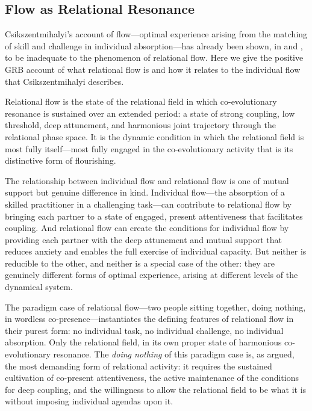 \subsection{Flow as Relational Resonance}
\label{p14:subsec:flow-grb}

\noindent
Csikszentmihalyi's account of flow---optimal experience arising from the matching of skill and challenge in individual absorption---has already been shown, in  and , to be inadequate to the phenomenon of relational flow. Here we give the positive GRB account of what relational flow is and how it relates to the individual flow that Csikszentmihalyi describes.

Relational flow is the state of the relational field in which co-evolutionary resonance is sustained over an extended period: a state of strong coupling, low threshold, deep attunement, and harmonious joint trajectory through the relational phase space. It is the dynamic condition in which the relational field is most fully itself---most fully engaged in the co-evolutionary activity that is its distinctive form of flourishing.

The relationship between individual flow and relational flow is one of mutual support but genuine difference in kind. Individual flow---the absorption of a skilled practitioner in a challenging task---can contribute to relational flow by bringing each partner to a state of engaged, present attentiveness that facilitates coupling. And relational flow can create the conditions for individual flow by providing each partner with the deep attunement and mutual support that reduces anxiety and enables the full exercise of individual capacity. But neither is reducible to the other, and neither is a special case of the other: they are genuinely different forms of optimal experience, arising at different levels of the dynamical system.

The paradigm case of relational flow---two people sitting together, doing nothing, in wordless co-presence---instantiates the defining features of relational flow in their purest form: no individual task, no individual challenge, no individual absorption. Only the relational field, in its own proper state of harmonious co-evolutionary resonance. The \emph{doing nothing} of this paradigm case is, as  argued, the most demanding form of relational activity: it requires the sustained cultivation of co-present attentiveness, the active maintenance of the conditions for deep coupling, and the willingness to allow the relational field to be what it is without imposing individual agendas upon it.

